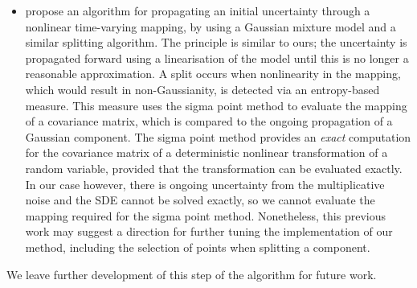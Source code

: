\begin{itemize}
	\item \citet{DeMarsEtAl_2013_EntropyBasedApproachUncertainty} propose an algorithm for propagating an initial uncertainty through a nonlinear time-varying mapping, by using a Gaussian mixture model and a similar splitting algorithm.
	      The principle is similar to ours; the uncertainty is propagated forward using a linearisation of the model until this is no longer a reasonable approximation.
	      A split occurs when nonlinearity in the mapping, which would result in non-Gaussianity, is detected via an entropy-based measure.
	      This measure uses the sigma point method to evaluate the mapping of a covariance matrix, which is compared to the ongoing propagation of a Gaussian component.
	      The sigma point method provides an \emph{exact} computation for the covariance matrix of a deterministic nonlinear transformation of a random variable, provided that the transformation can be evaluated exactly.
	      In our case however, there is ongoing uncertainty from the multiplicative noise and the SDE cannot be solved exactly, so we cannot evaluate the mapping required for the sigma point method.
	      Nonetheless, this previous work may suggest a direction for further tuning the implementation of our method, including the selection of points when splitting a component.

\end{itemize}
We leave further development of this step of the algorithm for future work.





